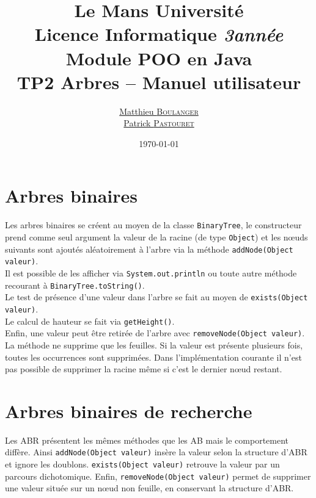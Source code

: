 \documentclass[a4paper,11pt]{article}
\title {\textbf {\color {blue} Le Mans Université}\color{black}
\\  Licence Informatique  \textit {3\ieme année}
 \\Module POO en Java
 \\ \textbf {TP2 Arbres -- Manuel utilisateur}}
\author{\href{mailto: matthieu.boulanger.etu@univ-lemans.fr} {Matthieu \textsc{Boulanger}}\\
      \href{mailto: patrick.pastouret.etu@univ-lemans.fr} {Patrick \textsc{Pastouret}}}
\date{\today}
\begin{document}
\maketitle

\section{Arbres binaires}

Les arbres binaires se créent au moyen de la classe \texttt{BinaryTree}, le constructeur prend comme seul argument la valeur de la racine (de type \texttt{Object}) et les n\oe uds suivants sont ajoutés aléatoirement à l'arbre via la méthode \texttt{addNode(Object valeur)}. \\
Il est possible de les afficher via \texttt{System.out.println} ou toute autre méthode recourant à \texttt{BinaryTree.toString()}.\\
Le test de présence d'une valeur dans l'arbre se fait au moyen de \texttt{exists(Object valeur)}. \\
Le calcul de hauteur se fait via \texttt{getHeight()}.\\
Enfin, une valeur peut être retirée de l'arbre avec \texttt{removeNode(Object valeur)}. La méthode ne supprime que les feuilles. Si la valeur est présente plusieurs fois, toutes les occurrences sont supprimées. Dans l'implémentation courante il n'est pas possible de supprimer la racine même si c'est le dernier n\oe ud restant.

\section{Arbres binaires de recherche}

Les ABR présentent les mêmes méthodes que les AB mais le comportement diffère. Ainsi \texttt{addNode(Object valeur)} insère la valeur selon la structure d'ABR et ignore les doublons. \texttt{exists(Object valeur)} retrouve la valeur par un parcours dichotomique. Enfin, \texttt{removeNode(Object valeur)} permet de supprimer une valeur située sur un n\oe ud non feuille, en conservant la structure d'ABR.
\end{document}
